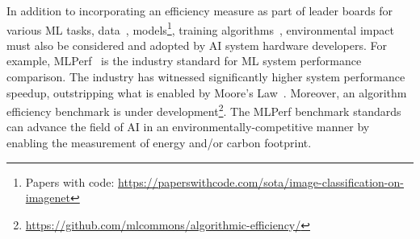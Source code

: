 In addition to incorporating an efficiency measure as part of leader boards for various ML tasks, data~\cite{kiela2021dynabench}, models\footnote{Papers with code: \url{https://paperswithcode.com/sota/image-classification-on-imagenet}}, training algorithms~\cite{hernandez2020efficiency}, environmental impact must also be considered and adopted by AI system hardware developers.
For example, MLPerf~\cite{Mattson:ieee-micro:2020,Reddi:ieee-micro:2021,mlperf:mobile} is the industry standard for ML system performance comparison. 
The industry has witnessed significantly higher system performance speedup, outstripping what is enabled by Moore's Law~\cite{mlperf-training,mlperf-inference}. Moreover, 
an algorithm efficiency benchmark is under development\footnote{\url{https://github.com/mlcommons/algorithmic-efficiency/}}. 
 The MLPerf benchmark standards can advance the field of AI in an environmentally-competitive manner by enabling the measurement of energy and/or carbon footprint.


